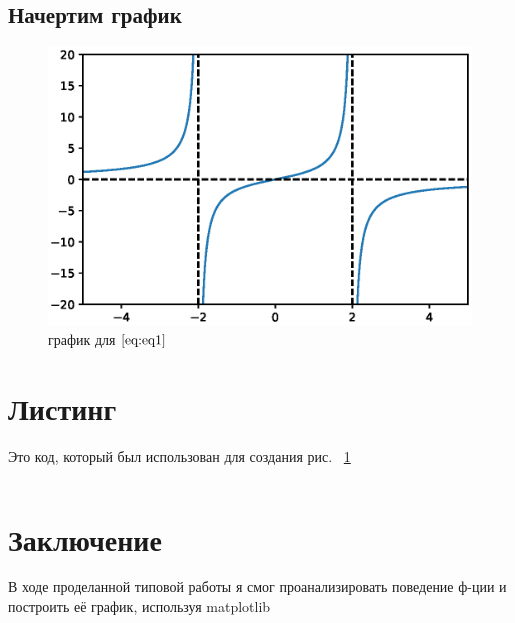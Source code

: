 \subsection{Начертим график}
    \begin{figure}[H]
        \includegraphics[width=\textwidth]{fig/mainPlot.eps} 
        \caption{график для $\eqref{eq:eq1}$}
        \label{fig:mainPlot}
    \end{figure}
    
\newpage
\section{Листинг}
    Это код, который был использован для создания рис. ~\ref{fig:mainPlot}
    \begin{code}
    	\inputminted[breaklines=true, xleftmargin=1em, linenos, frame=single, framesep=10pt, fontsize=\footnotesize, firstline=1, lastline=33]{python}{listings/python_code.py}
    	\caption{Питон - в массы)))}
    \end{code}

\newpage
\section*{Заключение}
В ходе проделанной типовой работы я смог проанализировать поведение ф-ции и построить её график, используя matplotlib
